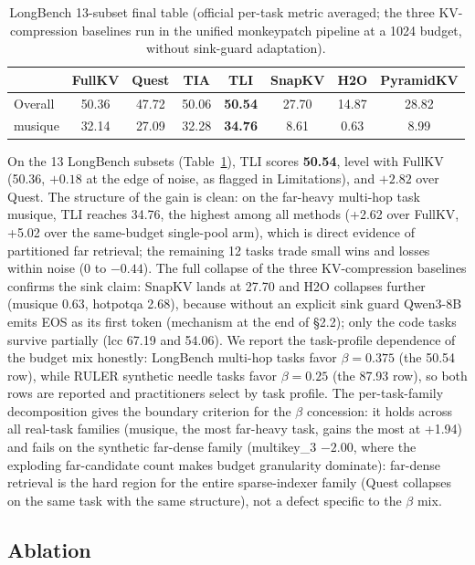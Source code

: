 \documentclass[11pt]{article}
\begin{document}
\begin{table}[h]\centering
\caption{LongBench 13-subset final table (official per-task metric averaged; the three KV-compression baselines run in the unified monkeypatch pipeline at a 1024 budget, without sink-guard adaptation).}
\label{tab:longbench}
\begin{tabular}{lccccccc}
\toprule
 & FullKV & Quest & TIA & TLI & SnapKV & H2O & PyramidKV \\
\midrule
Overall & 50.36 & 47.72 & 50.06 & \textbf{50.54} & 27.70 & 14.87 & 28.82 \\
musique & 32.14 & 27.09 & 32.28 & \textbf{34.76} & 8.61 & 0.63 & 8.99 \\
\bottomrule
\end{tabular}
\end{table}

On the 13 LongBench subsets (Table~\ref{tab:longbench}), TLI scores \textbf{50.54}, level with FullKV (50.36, $+0.18$ at the edge of noise, as flagged in Limitations), and $+2.82$ over Quest. The structure of the gain is clean: on the far-heavy multi-hop task musique, TLI reaches 34.76, the highest among all methods (+2.62 over FullKV, +5.02 over the same-budget single-pool arm), which is direct evidence of partitioned far retrieval; the remaining 12 tasks trade small wins and losses within noise ($0$ to $-0.44$). The full collapse of the three KV-compression baselines confirms the sink claim: SnapKV lands at 27.70 and H2O collapses further (musique 0.63, hotpotqa 2.68), because without an explicit sink guard Qwen3-8B emits EOS as its first token (mechanism at the end of \S2.2); only the code tasks survive partially (lcc 67.19 and 54.06). We report the task-profile dependence of the budget mix honestly: LongBench multi-hop tasks favor $\beta{=}0.375$ (the 50.54 row), while RULER synthetic needle tasks favor $\beta{=}0.25$ (the 87.93 row), so both rows are reported and practitioners select by task profile. The per-task-family decomposition gives the boundary criterion for the $\beta$ concession: it holds across all real-task families (musique, the most far-heavy task, gains the most at +1.94) and fails on the synthetic far-dense family (multikey\_3 $-2.00$, where the exploding far-candidate count makes budget granularity dominate): far-dense retrieval is the hard region for the entire sparse-indexer family (Quest collapses on the same task with the same structure), not a defect specific to the $\beta$ mix.

\subsection{Ablation}
\end{document}

